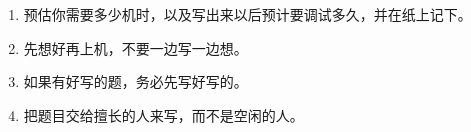 \begin{enumerate}
    \item 预估你需要多少机时，以及写出来以后预计要调试多久，并在纸上记下。
    \item 先想好再上机，不要一边写一边想。
    \item 如果有好写的题，务必先写好写的。
    \item 把题目交给擅长的人来写，而不是空闲的人。
\end{enumerate}